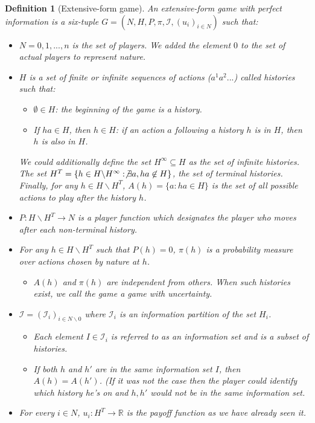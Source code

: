 \documentclass[12pt]{report}
\newtheorem{definition}{Definition}[chapter]
\begin{document}
\begin{definition}[Extensive-form game]
An extensive-form game with perfect information is a six-tuple $G = (N, H, P, \pi, \mathcal{I}, (u_i)_{i\in N})$ such that:\begin{itemize}
\item $N = {0, 1, ..., n}$ is the set of players. We added the element $0$ to the set of actual players to represent nature.
\item $H$ is a set of finite or infinite sequences of actions ($a^1a^2 ...$) called histories such that:\begin{itemize}
\item $\emptyset \in H$: the beginning of the game is a history.
\item If $ha\in H$, then $h\in H$: if an action $a$ following a history $h$ is in $H$, then $h$ is also in $H$.
\end{itemize}
We could additionally define the set $H^\infty\subseteq H$ as the set of infinite histories. The set $H^T = \{h \in H\backslash H^\infty : \not\exists a, ha\not\in H\}$, the set of terminal histories. Finally, for any $h\in H\backslash H^T$, $A(h) = \{a : ha\in H\}$ is the set of all possible actions to play after the history $h$.
\item $P: H\backslash H^T \to N$ is a player function which designates the player who moves after each non-terminal history.
\item For any $h\in H\backslash H^T$ such that $P(h) = 0$, $\pi(h)$ is a probability measure over actions chosen by nature at $h$. \begin{itemize}
\item $A(h)$ and $\pi(h)$ are independent from others. When such histories exist, we call the game a game with uncertainty.
\end{itemize}
\item $\mathcal{I} = (\mathcal{I}_i)_{i\in N\backslash 0}$ where $\mathcal{I}_i$ is an information partition of the set $H_i$. \begin{itemize}
\item Each element $I\in\mathcal{I}_i$ is referred to as an information set and is a subset of histories.
\item If both $h$ and $h'$ are in the same information set $I$, then $A(h) = A(h')$. (If it was not the case then the player could identify which history he's on and $h,h'$ would not be in the same information set.
\end{itemize}
\item For every $i\in N$, $u_i:H^T\to \mathbb{R}$ is the payoff function as we have already seen it.
\end{itemize}
\end{definition}
\end{document}

